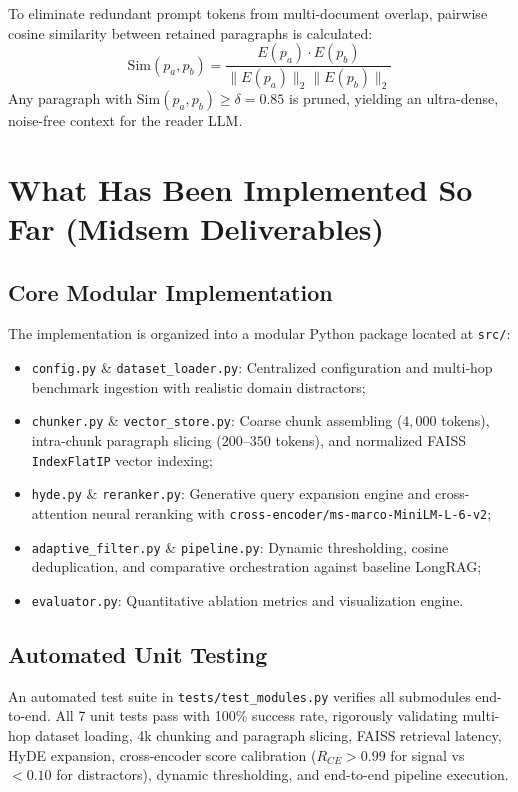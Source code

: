 \documentclass[10pt,journal,compsoc]{IEEEtran}
\begin{document}
To eliminate redundant prompt tokens from multi-document overlap, pairwise cosine similarity between retained paragraphs is calculated:
\begin{equation}
\text{Sim}(p_a, p_b) = \frac{E(p_a) \cdot E(p_b)}{\|E(p_a)\|_2 \|E(p_b)\|_2}
\end{equation}
Any paragraph with $\text{Sim}(p_a, p_b) \ge \delta = 0.85$ is pruned, yielding an ultra-dense, noise-free context for the reader LLM.

\section{What Has Been Implemented So Far (Midsem Deliverables)}

\subsection{Core Modular Implementation}
The implementation is organized into a modular Python package located at \texttt{src/}:
\begin{itemize}
    \item \texttt{config.py} \& \texttt{dataset\_loader.py}: Centralized configuration and multi-hop benchmark ingestion with realistic domain distractors;
    \item \texttt{chunker.py} \& \texttt{vector\_store.py}: Coarse chunk assembling ($4,000$ tokens), intra-chunk paragraph slicing ($200$--$350$ tokens), and normalized FAISS \texttt{IndexFlatIP} vector indexing;
    \item \texttt{hyde.py} \& \texttt{reranker.py}: Generative query expansion engine and cross-attention neural reranking with \texttt{cross-encoder/ms-marco-MiniLM-L-6-v2};
    \item \texttt{adaptive\_filter.py} \& \texttt{pipeline.py}: Dynamic thresholding, cosine deduplication, and comparative orchestration against baseline LongRAG;
    \item \texttt{evaluator.py}: Quantitative ablation metrics and visualization engine.
\end{itemize}

\subsection{Automated Unit Testing}
An automated test suite in \texttt{tests/test\_modules.py} verifies all submodules end-to-end. All 7 unit tests pass with 100\% success rate, rigorously validating multi-hop dataset loading, 4k chunking and paragraph slicing, FAISS retrieval latency, HyDE expansion, cross-encoder score calibration ($R_{CE} > 0.99$ for signal vs $<0.10$ for distractors), dynamic thresholding, and end-to-end pipeline execution.
\end{document}
